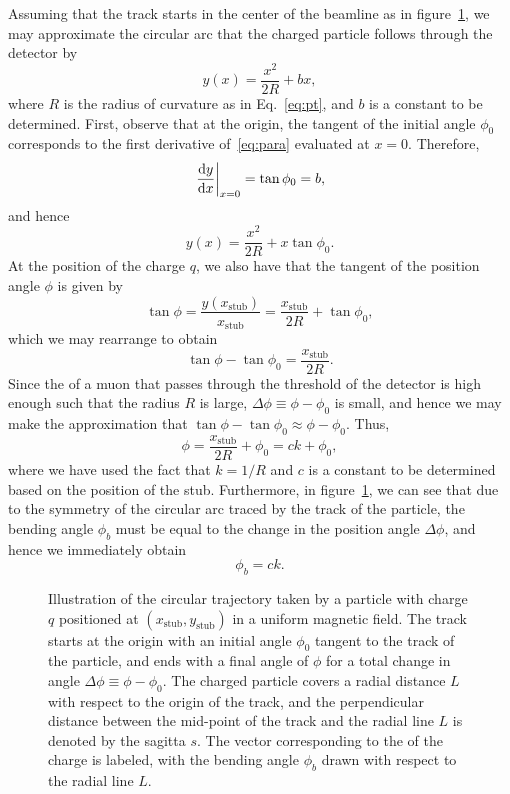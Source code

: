 Assuming that the track starts in the center of the beamline as in figure~\ref{fig:arc}, we may approximate the circular arc that the charged particle follows through the detector by
\begin{equation}\label{eq:para}
  y(x)=\frac{x^2}{2R}+bx,
\end{equation}
where $R$ is the radius of curvature as in Eq.~\ref{eq:pt}, and $b$ is a constant to be determined.
First, observe that at the origin, the tangent of the initial angle $\phi_0$ corresponds to the first derivative of~\ref{eq:para} evaluated at $x=0$. Therefore,
\begin{equation}
  \eval{\dv{y}{x}}_{x=0}=\tan\phi_0=b,
\end{equation}
and hence
\begin{equation}
  y(x)=\frac{x^2}{2R}+x\tan\phi_0.
\end{equation}
At the position of the charge $q$, we also have that the tangent of the position angle $\phi$ is given by
\begin{equation}
  \tan\phi=\frac{y(x_\mathrm{stub})}{x_\mathrm{stub}}=\frac{x_\mathrm{stub}}{2R}+\tan\phi_0,
\end{equation}
which we may rearrange to obtain
\begin{equation}
  \tan\phi-\tan\phi_0=\frac{x_\mathrm{stub}}{2R}.
\end{equation}
Since the \pt of a muon that passes through the threshold of the detector is high enough such that the radius $R$ is large, $\Delta\phi\equiv\phi-\phi_0$ is small, and hence we may make the approximation that $\tan\phi-\tan\phi_0\approx\phi-\phi_0$.
Thus,
\begin{equation}\label{eq:phi}
  \phi=\frac{x_\mathrm{stub}}{2R}+\phi_0=ck+\phi_0,
\end{equation}
where we have used the fact that $k=1/R$ and $c$ is a constant to be determined based on the position of the stub.
Furthermore, in figure~\ref{fig:arc}, we can see that due to the symmetry of the circular arc traced by the track of the particle, the bending angle $\phi_b$ must be equal to the change in the position angle $\Delta\phi$, and hence we immediately obtain
\begin{equation}\label{eq:phib}
  \phi_b=ck.
\end{equation}

\begin{figure}[htbp]
  \centering
  
  \caption{Illustration of the circular trajectory taken by a particle with charge $q$ positioned at $(x_\mathrm{stub},y_\mathrm{stub})$ in a uniform magnetic field. The track starts at the origin with an initial angle $\phi_0$ tangent to the track of the particle, and ends with a final angle of $\phi$ for a total change in angle $\Delta\phi\equiv\phi-\phi_0$. The charged particle covers a radial distance $L$ with respect to the origin of the track, and the perpendicular distance between the mid-point of the track and the radial line $L$ is denoted by the sagitta $s$. The vector corresponding to the \pt of the charge is labeled, with the bending angle $\phi_b$ drawn with respect to the radial line $L$.}
  \label{fig:arc}
\end{figure}

